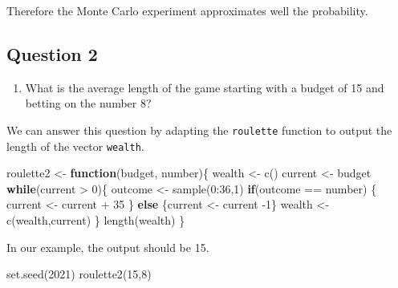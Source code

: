 \documentclass[
]{book}
\newenvironment{Shaded}{\begin{snugshade}}{\end{snugshade}}
\newcommand{\ControlFlowTok}[1]{\textcolor[rgb]{0.13,0.29,0.53}{\textbf{#1}}}
\newcommand{\DecValTok}[1]{\textcolor[rgb]{0.00,0.00,0.81}{#1}}
\newcommand{\FunctionTok}[1]{\textcolor[rgb]{0.00,0.00,0.00}{#1}}
\newcommand{\NormalTok}[1]{#1}
\newcommand{\OtherTok}[1]{\textcolor[rgb]{0.56,0.35,0.01}{#1}}
\newcommand{\SpecialCharTok}[1]{\textcolor[rgb]{0.00,0.00,0.00}{#1}}
\providecommand{\tightlist}{%
  \setlength{\itemsep}{0pt}\setlength{\parskip}{0pt}}
\begin{document}
Therefore the Monte Carlo experiment approximates well the probability.

\hypertarget{question-2}{%
\subsection{Question 2}\label{question-2}}

\begin{enumerate}
\def\labelenumi{\arabic{enumi}.}
\setcounter{enumi}{1}
\tightlist
\item
  What is the average length of the game starting with a budget of 15 and betting on the number 8?
\end{enumerate}

We can answer this question by adapting the \texttt{roulette} function to output the length of the vector \texttt{wealth}.

\begin{Shaded}
\begin{Highlighting}[]
\NormalTok{roulette2 }\OtherTok{\textless{}{-}} \ControlFlowTok{function}\NormalTok{(budget, number)\{}
\NormalTok{  wealth }\OtherTok{\textless{}{-}} \FunctionTok{c}\NormalTok{()}
\NormalTok{  current }\OtherTok{\textless{}{-}}\NormalTok{ budget}
  \ControlFlowTok{while}\NormalTok{(current }\SpecialCharTok{\textgreater{}} \DecValTok{0}\NormalTok{)\{}
\NormalTok{    outcome }\OtherTok{\textless{}{-}} \FunctionTok{sample}\NormalTok{(}\DecValTok{0}\SpecialCharTok{:}\DecValTok{36}\NormalTok{,}\DecValTok{1}\NormalTok{)}
    \ControlFlowTok{if}\NormalTok{(outcome }\SpecialCharTok{==}\NormalTok{ number) \{}
\NormalTok{      current }\OtherTok{\textless{}{-}}\NormalTok{ current }\SpecialCharTok{+} \DecValTok{35}
\NormalTok{    \}}
    \ControlFlowTok{else}\NormalTok{ \{current }\OtherTok{\textless{}{-}}\NormalTok{ current }\SpecialCharTok{{-}}\DecValTok{1}\NormalTok{\}}
\NormalTok{    wealth }\OtherTok{\textless{}{-}} \FunctionTok{c}\NormalTok{(wealth,current)}
\NormalTok{  \}}
  \FunctionTok{length}\NormalTok{(wealth)}
\NormalTok{\}}
\end{Highlighting}
\end{Shaded}

In our example, the output should be 15.

\begin{Shaded}
\begin{Highlighting}[]
\FunctionTok{set.seed}\NormalTok{(}\DecValTok{2021}\NormalTok{)}
\FunctionTok{roulette2}\NormalTok{(}\DecValTok{15}\NormalTok{,}\DecValTok{8}\NormalTok{)}
\end{Highlighting}
\end{Shaded}
\end{document}

